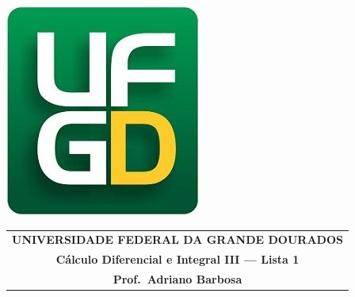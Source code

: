 \documentclass[a4paper,5pt]{amsbook}
\begin{document}
\thispagestyle{empty}
\pagestyle{empty}
\begin{minipage}[h]{0.14\textwidth}
	\includegraphics[scale=0.24]{../../ufgd.png}
\end{minipage}
\begin{minipage}[h]{\textwidth}
\begin{tabular}{c}
{{\bf UNIVERSIDADE FEDERAL DA GRANDE DOURADOS}}\\
{{\bf C\'alculo Diferencial e Integral III --- Lista 1}}\\
{{\bf Prof.\ Adriano Barbosa}}\\
\end{tabular}
\vspace{-0.45cm}
%
\end{minipage}

\end{document}
